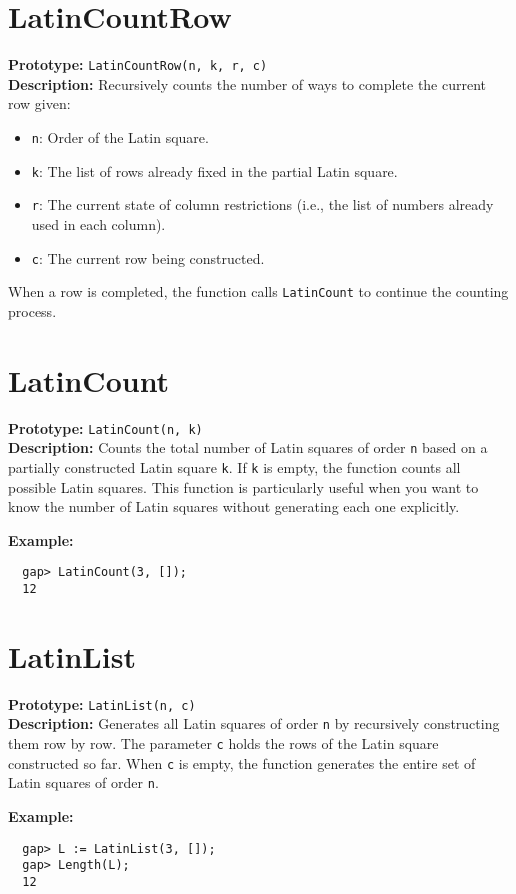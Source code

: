 \documentclass{report}
\begin{document}
\section{LatinCountRow}
\textbf{Prototype:} \texttt{LatinCountRow(n, k, r, c)}\\[1mm]
\textbf{Description:}  
Recursively counts the number of ways to complete the current row given:
\begin{itemize}
  \item \texttt{n}: Order of the Latin square.
  \item \texttt{k}: The list of rows already fixed in the partial Latin square.
  \item \texttt{r}: The current state of column restrictions (i.e., the list of numbers already used in each column).
  \item \texttt{c}: The current row being constructed.
\end{itemize}
When a row is completed, the function calls \texttt{LatinCount} to continue the counting process.

\section{LatinCount}
\textbf{Prototype:} \texttt{LatinCount(n, k)}\\[1mm]
\textbf{Description:}  
Counts the total number of Latin squares of order \texttt{n} based on a partially constructed Latin square \texttt{k}. If \texttt{k} is empty, the function counts all possible Latin squares. This function is particularly useful when you want to know the number of Latin squares without generating each one explicitly.

\textbf{Example:}
\begin{verbatim}
  gap> LatinCount(3, []);
  12
\end{verbatim}

\section{LatinList}
\textbf{Prototype:} \texttt{LatinList(n, c)}\\[1mm]
\textbf{Description:}  
Generates all Latin squares of order \texttt{n} by recursively constructing them row by row. The parameter \texttt{c} holds the rows of the Latin square constructed so far. When \texttt{c} is empty, the function generates the entire set of Latin squares of order \texttt{n}.

\textbf{Example:}
\begin{verbatim}
  gap> L := LatinList(3, []);
  gap> Length(L);
  12
\end{verbatim}
\end{document}
